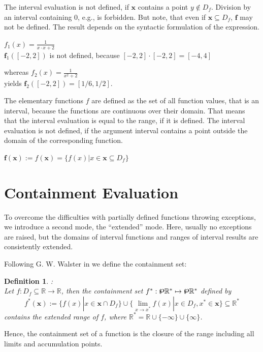 \documentclass{report}
\newcommand{\Rs}{\mathbb{R}^*}
\newcommand{\R}{\mathbb{R}}
\newcommand{\xx}{\mathbf{x}}
\newcommand{\ff}{\mathbf{f}}
\newtheorem{defin}{Definition}
\newcommand{\Pot} {\mbox{\raisebox{0.4ex}{\boldmath $\wp$}} }
\begin{document}
The interval evaluation is not defined, if $\xx$ contains a point $y
\notin D_f$. Division by an interval containing 0, e.g., is forbidden.
But note, that even if $\xx \subseteq D_f$, $\ff$ may  not be defined. The result
depends on the syntactic formulation of the expression.


$f_1(x) = \frac{1}{x\cdot x + 2} $\\
$ \mathbf{f}_1([-2,2])$
is not defined, because
 $[-2,2] \cdot [-2,2] = [-4,4]$

whereas
 $ f_2(x) =
\frac{1}{x^2 +2}$\\ yields  $\mathbf{f}_2([-2,2])= [1/6, 1/2]$.

The elementary functions $f$ are defined as the set  of all function values,
that is an  interval,
because the functions are continuous over their domain. 
That means that  the interval evaluation is
equal to the range, if it is defined. The interval evaluation is not defined,
if the argument interval contains a point outside the domain of the
corresponding function.

$\ff(\xx):= f(\xx) = \{f(x)| x \in \xx \subseteq D_f\}$



\section{Containment Evaluation}


To overcome the difficulties with partially defined functions throwing
exceptions, we introduce a second mode, the ``extended'' mode.
Here, usually no exceptions are raised, but the domains of interval
functions and  ranges of interval results are consistently extended.

Following G. W. Walster in \cite{sun,ext} we define the containment set:
\begin{defin}:\\
Let $f : D_f \subseteq \R \rightarrow \R$, then the containment set
$f^\ast: \Pot\R^\ast\mapsto \Pot\R^\ast$ defined by
\begin{equation}
f^*(\xx):= \{f(x)| x \in \xx \cap D_f\} \cup \{ \lim_{x\rightarrow x^*} f(x) | x
\in D_f, x^* \in \xx\} \subseteq \Rs   \label{cs}
\end{equation} contains the extended range of $f$, where
$\Rs = \R \cup \{ -\infty\} \cup \{ \infty\}$.
\end{defin}

Hence, the containment set of a function is the closure of the range including all
limits and accumulation points.
\end{document}
